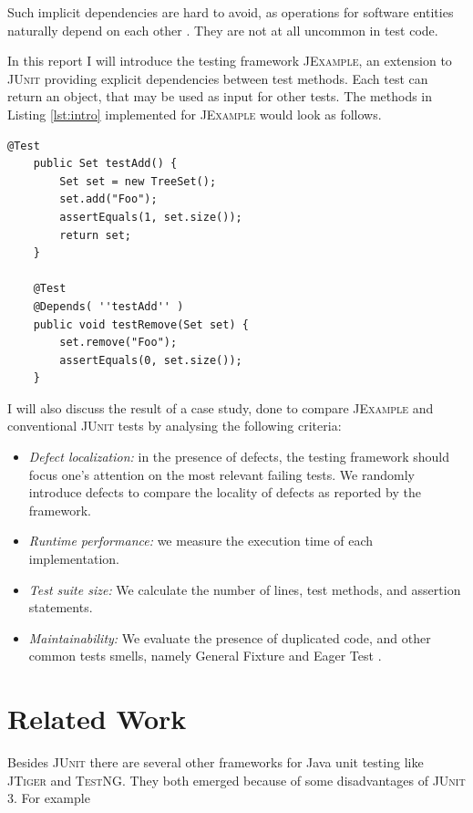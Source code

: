 \documentclass[11pt,a4paper,pdftex]{article}
\newcommand{\JUnit}{\textsc{JUnit}\xspace}
\newcommand{\JExample}{\textsc{JExample}\xspace}
\newcommand{\TestNG}{\textsc{TestNG}\xspace}
\newcommand{\JTiger}{\textsc{JTiger}\xspace}
\begin{document}
Such implicit dependencies are hard to avoid, as operations for software entities naturally depend on each other \cite{Fews99a, Mesz07a, Deur01a}. They are not at all uncommon in test code.

In this report I will introduce the testing framework \JExample, an extension to \JUnit providing explicit dependencies between test methods.
Each test can return an object, that may be used as input for other tests.
The methods in Listing \ref{lst:intro} implemented for \JExample would look as follows.

\begin{lstlisting}[label=lst:introDep,caption=Explicit dependency between test methods in \JExample.]
    @Test
    public Set testAdd() {
    	Set set = new TreeSet();
        set.add("Foo");
        assertEquals(1, set.size());
        return set;
    }

    @Test
    @Depends( ''testAdd'' )
    public void testRemove(Set set) {
        set.remove("Foo");
        assertEquals(0, set.size());
    }
\end{lstlisting}

I will also discuss the result of a case study, done to compare \JExample and conventional \JUnit tests by analysing the following criteria:
\begin{itemize}
\item \emph{Defect localization:} in the presence of defects, the testing framework should focus one's attention on the most relevant failing tests. We randomly introduce defects to compare the locality of defects as reported by the framework.
\item \emph{Runtime performance:} we measure the execution time of each implementation.
\item \emph{Test suite size:} We calculate the number of lines, test methods, and assertion statements.
\item \emph{Maintainability:} We evaluate the presence of duplicated code, and other common tests smells, namely General Fixture and Eager Test \cite{Deur01a}.
\end{itemize}
 
\section{Related Work}

Besides \JUnit there are several other frameworks for Java unit testing like \JTiger and \TestNG. They both emerged because of some disadvantages of \JUnit 3. For example
\end{document}
